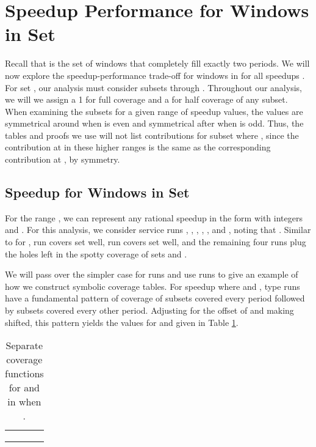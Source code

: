 \documentclass[11pt]{article}
\begin{document}
\section{Speedup Performance for Windows in Set }
\label{section:performance W_2}

Recall that  is the set of windows that completely fill exactly two periods.
We will now explore the speedup-performance trade-off for windows in  for all speedups .  For set , our analysis must consider subsets  through .  Throughout our analysis, we will we assign a 1 for full coverage and a  for half coverage of any subset.  When examining the subsets for a given range of speedup values, the values are symmetrical around  when  is even and symmetrical after  when  is odd.  Thus, the tables and proofs we use will not list contributions for subset  where ,  since the contribution at  in these higher ranges is the same as the corresponding contribution at , by symmetry.

\subsection{Speedup  for Windows in Set }
\label{subsection:1<s<2 W_2}

For the range , we can represent any rational speedup  in the form  with integers  and .  For this analysis, we consider service runs , , , , , and , noting that .  Similar to  for , run  covers set  well, run  covers set  well, and the remaining four runs plug the holes left in the spotty coverage of sets  and .

We will pass over the simpler case for  runs and use  runs to give an example of how we construct symbolic coverage tables.  For speedup  where  and , type  runs have a fundamental pattern of coverage of  subsets covered every period followed by  subsets covered every other period.  Adjusting for the offset of  and making  shifted, this pattern yields the values for  and  given in Table \ref{table:F functions for A_r-k runs}.


\begin{table}[!hbt]
\begin{center}
\begin{tabular}{rll}
 &  &

\\ \\
 &  &

\end{tabular}
\end{center}
\caption{Separate coverage functions for  and  in  when .}
\label{table:F functions for A_r-k runs} 
\end{table}
\end{document}
